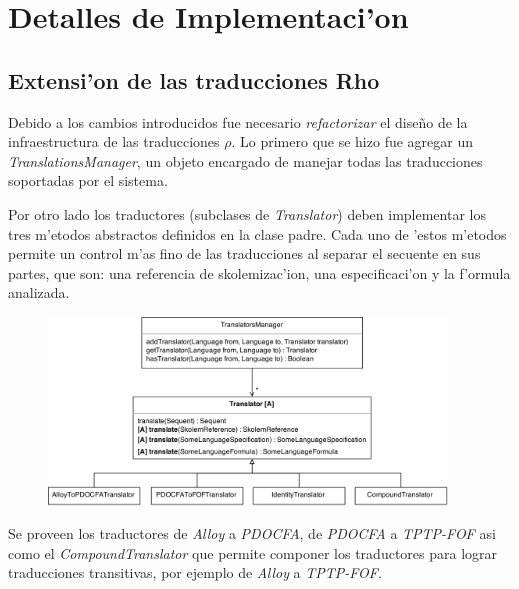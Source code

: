 \section{Detalles de Implementaci'on}
\subsection{Extensi'on de las traducciones Rho}


Debido a los cambios introducidos fue necesario \textit{refactorizar} el diseño de la infraestructura de las traducciones $\rho$. Lo primero que se hizo fue agregar un \textit{TranslationsManager}, un objeto encargado de manejar todas las traducciones soportadas por el sistema. 

Por otro lado los traductores (subclases de \textit{Translator}) deben implementar los tres m'etodos  abstractos definidos en la clase padre. Cada uno de 'estos m'etodos permite un control m'as fino de las traducciones al separar el secuente en sus partes, que son: una referencia de skolemizac'ion, una especificaci'on y la f'ormula analizada.

\begin{figure}[H]
	\includegraphics[width=400px]{img/arq_traductores.png}
\end{figure}

Se proveen los traductores de \textit{Alloy} a \textit{PDOCFA}, de \textit{PDOCFA} a \textit{TPTP-FOF} asi como el \textit{CompoundTranslator} que permite componer los traductores para lograr traducciones transitivas, por ejemplo de \textit{Alloy} a \textit{TPTP-FOF}.


